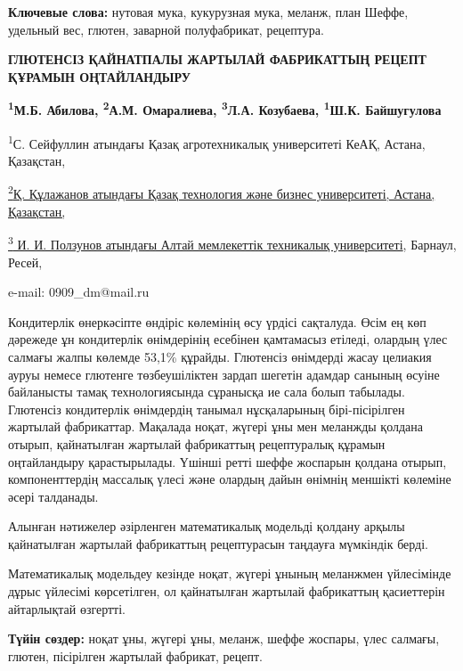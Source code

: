 {\bfseries Ключевые слова:} нутовая мука, кукурузная мука, меланж, план
Шеффе, удельный вес, глютен, заварной полуфабрикат, рецептура.

\begin{articleheader}
{\bfseries ГЛЮТЕНСІЗ ҚАЙНАТПАЛЫ ЖАРТЫЛАЙ ФАБРИКАТТЫҢ РЕЦЕПТ ҚҰРАМЫН
ОҢТАЙЛАНДЫРУ}

{\bfseries \textsuperscript{1}М.Б. Абилова\textsuperscript{\envelope },
\textsuperscript{2}А.М. Омаралиева, \textsuperscript{3}Л.А. Козубаева,
\textsuperscript{1}Ш.К. Байшугулова}
\end{articleheader}

\begin{affiliation}
\textsuperscript{1}С. Сейфуллин атындағы Қазақ агротехникалық
университеті КеАҚ, Астана, Қазақстан,

\href{https://bankchart.kz/spravochniki/pochtovyye_indeksy/id/116470}{\textsuperscript{2}Қ.
Құлажанов атындағы Қазақ технология және бизнес университеті, Астана,
Қазақстан,}

\href{https://bankchart.kz/spravochniki/pochtovyye_indeksy/id/116470}{\textsuperscript{3}
И. И. Ползунов атындағы Алтай мемлекеттік техникалық университеті},
Барнаул, Ресей,

e-mail: 0909\_dm@mail.ru
\end{affiliation}

Кондитерлік өнеркәсіпте өндіріс көлемінің өсу үрдісі сақталуда. Өсім ең
көп дәрежеде ұн кондитерлік өнімдерінің есебінен қамтамасыз етіледі,
олардың үлес салмағы жалпы көлемде 53,1\% құрайды. Глютенсіз өнімдерді
жасау целиакия ауруы немесе глютенге төзбеушіліктен зардап шегетін
адамдар санының өсуіне байланысты тамақ технологиясында сұранысқа ие
сала болып табылады. Глютенсіз кондитерлік өнімдердің танымал
нұсқаларының бірі-пісірілген жартылай фабрикаттар. Мақалада ноқат,
жүгері ұны мен меланжды қолдана отырып, қайнатылған жартылай фабрикаттың
рецептуралық құрамын оңтайландыру қарастырылады. Үшінші ретті шеффе
жоспарын қолдана отырып, компоненттердің массалық үлесі және олардың
дайын өнімнің меншікті көлеміне әсері талданады.

Алынған нәтижелер әзірленген математикалық модельді қолдану арқылы
қайнатылған жартылай фабрикаттың рецептурасын таңдауға мүмкіндік берді.

Математикалық модельдеу кезінде ноқат, жүгері ұнының меланжмен
үйлесімінде дұрыс үйлесімі көрсетілген, ол қайнатылған жартылай
фабрикаттың қасиеттерін айтарлықтай өзгертті.

{\bfseries Түйін сөздер:} ноқат ұны, жүгері ұны, меланж, шеффе жоспары,
үлес салмағы, глютен, пісірілген жартылай фабрикат, рецепт.

